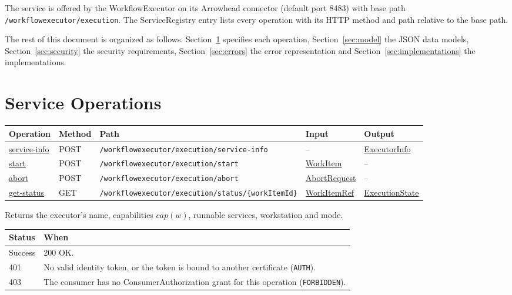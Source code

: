\documentclass[a4paper]{arrowhead}
\newcommand{\mref}[1]{{\textcolor{ArrowheadPurple}{\hyperref[sec:model:#1]{#1}}}}
\newcommand{\oref}[1]{{\textcolor{ArrowheadBlue}{\hyperref[sec:operations:#1]{#1}}}}
\begin{document}
The service is offered by the WorkflowExecutor on its Arrowhead connector (default port 8483) with base path \texttt{/\allowbreak{}workflowexecutor/\allowbreak{}execution}.
The ServiceRegistry entry lists every operation with its HTTP method and path relative to the base path.

The rest of this document is organized as follows. Section~\ref{sec:operations} specifies each operation,
Section~\ref{sec:model} the JSON data models, Section~\ref{sec:security} the security requirements,
Section~\ref{sec:errors} the error representation and Section~\ref{sec:implementations} the implementations.

\newpage
\section{Service Operations}
\label{sec:operations}

{\small
\begin{longtable}{|p{3.0cm}|p{1.5cm}|p{5.3cm}|p{3.0cm}|p{3.0cm}|}

\hline
\rowcolor{gray!33} Operation & Method & Path & Input & Output \\ \hline
\endhead
\oref{service-info} & POST & \texttt{/\allowbreak{}workflowexecutor/\allowbreak{}execution/\allowbreak{}service-\allowbreak{}info} & -- & \mref{ExecutorInfo} \\ \hline
\oref{start} & POST & \texttt{/\allowbreak{}workflowexecutor/\allowbreak{}execution/\allowbreak{}start} & \mref{WorkItem} & -- \\ \hline
\oref{abort} & POST & \texttt{/\allowbreak{}workflowexecutor/\allowbreak{}execution/\allowbreak{}abort} & \mref{AbortRequest} & -- \\ \hline
\oref{get-status} & GET & \texttt{/\allowbreak{}workflowexecutor/\allowbreak{}execution/\allowbreak{}status/\allowbreak{}\{workItemId\}} & \mref{WorkItemRef} & \mref{ExecutionState} \\ \hline
\end{longtable}
}

Returns the executor's name, capabilities $cap(w)$, runnable services, workstation and mode.

{\small
\begin{longtable}{|p{2.0cm}|p{13.8cm}|}

\hline
\rowcolor{gray!33} Status & When \\ \hline
\endhead
Success & 200 OK. \\ \hline
401 & No valid identity token, or the token is bound to another certificate (\texttt{AUTH}). \\ \hline
403 & The consumer has no ConsumerAuthorization grant for this operation (\texttt{FORBIDDEN}). \\ \hline
\end{longtable}
}
\end{document}
